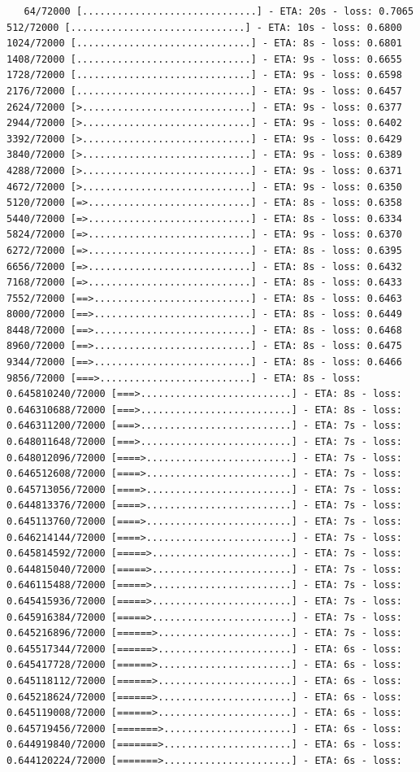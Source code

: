 \documentclass[12pt,fleqn]{article}\usepackage{../../common}
\begin{document}
\begin{verbatim}
   64/72000 [..............................] - ETA: 20s - loss: 0.7065  512/72000 [..............................] - ETA: 10s - loss: 0.6800 1024/72000 [..............................] - ETA: 8s - loss: 0.6801  1408/72000 [..............................] - ETA: 9s - loss: 0.6655 1728/72000 [..............................] - ETA: 9s - loss: 0.6598 2176/72000 [..............................] - ETA: 9s - loss: 0.6457 2624/72000 [>.............................] - ETA: 9s - loss: 0.6377 2944/72000 [>.............................] - ETA: 9s - loss: 0.6402 3392/72000 [>.............................] - ETA: 9s - loss: 0.6429 3840/72000 [>.............................] - ETA: 9s - loss: 0.6389 4288/72000 [>.............................] - ETA: 9s - loss: 0.6371 4672/72000 [>.............................] - ETA: 9s - loss: 0.6350 5120/72000 [=>............................] - ETA: 8s - loss: 0.6358 5440/72000 [=>............................] - ETA: 8s - loss: 0.6334 5824/72000 [=>............................] - ETA: 9s - loss: 0.6370 6272/72000 [=>............................] - ETA: 8s - loss: 0.6395 6656/72000 [=>............................] - ETA: 8s - loss: 0.6432 7168/72000 [=>............................] - ETA: 8s - loss: 0.6433 7552/72000 [==>...........................] - ETA: 8s - loss: 0.6463 8000/72000 [==>...........................] - ETA: 8s - loss: 0.6449 8448/72000 [==>...........................] - ETA: 8s - loss: 0.6468 8960/72000 [==>...........................] - ETA: 8s - loss: 0.6475 9344/72000 [==>...........................] - ETA: 8s - loss: 0.6466 9856/72000 [===>..........................] - ETA: 8s - loss: 0.645810240/72000 [===>..........................] - ETA: 8s - loss: 0.646310688/72000 [===>..........................] - ETA: 8s - loss: 0.646311200/72000 [===>..........................] - ETA: 7s - loss: 0.648011648/72000 [===>..........................] - ETA: 7s - loss: 0.648012096/72000 [====>.........................] - ETA: 7s - loss: 0.646512608/72000 [====>.........................] - ETA: 7s - loss: 0.645713056/72000 [====>.........................] - ETA: 7s - loss: 0.644813376/72000 [====>.........................] - ETA: 7s - loss: 0.645113760/72000 [====>.........................] - ETA: 7s - loss: 0.646214144/72000 [====>.........................] - ETA: 7s - loss: 0.645814592/72000 [=====>........................] - ETA: 7s - loss: 0.644815040/72000 [=====>........................] - ETA: 7s - loss: 0.646115488/72000 [=====>........................] - ETA: 7s - loss: 0.645415936/72000 [=====>........................] - ETA: 7s - loss: 0.645916384/72000 [=====>........................] - ETA: 7s - loss: 0.645216896/72000 [======>.......................] - ETA: 7s - loss: 0.645517344/72000 [======>.......................] - ETA: 6s - loss: 0.645417728/72000 [======>.......................] - ETA: 6s - loss: 0.645118112/72000 [======>.......................] - ETA: 6s - loss: 0.645218624/72000 [======>.......................] - ETA: 6s - loss: 0.645119008/72000 [======>.......................] - ETA: 6s - loss: 0.645719456/72000 [=======>......................] - ETA: 6s - loss: 0.644919840/72000 [=======>......................] - ETA: 6s - loss: 0.644120224/72000 [=======>......................] - ETA: 6s - loss: 
\end{verbatim}
\end{document}
